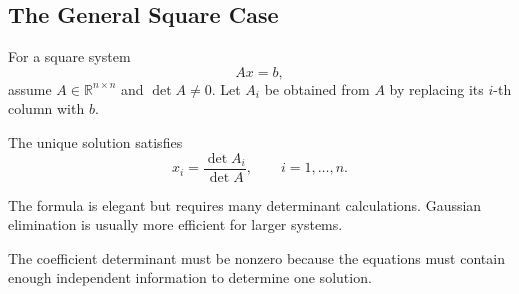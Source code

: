 \subsection{The General Square Case}

For a square system
\[
Ax=b,
\]
assume $A\in\mathbb R^{n\times n}$ and $\det A\neq0$. Let $A_i$ be obtained from $A$ by replacing its $i$-th column with $b$.

\begin{theorembox}
The unique solution satisfies
\[
\boxed{x_i=\frac{\det A_i}{\det A}},
\qquad i=1,\ldots,n.
\]
\end{theorembox}

The formula is elegant but requires many determinant calculations. Gaussian elimination is usually more efficient for larger systems.

\begin{interpretationbox}
The coefficient determinant must be nonzero because the equations must contain enough independent information to determine one solution.
\end{interpretationbox}
